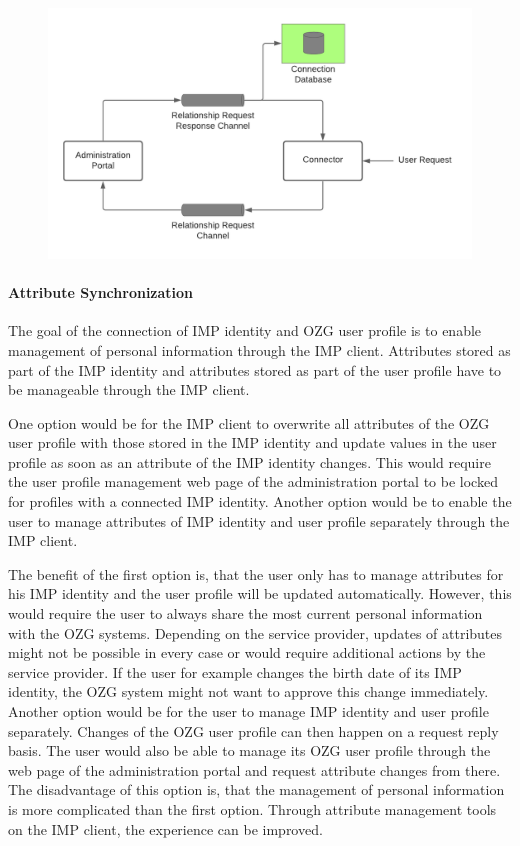 \documentclass[
     12pt,         %
     a4paper,      %
     BCOR=10mm,version=first,     %
     DIV=14,version=first,        %
     ]{scrreprt}
\begin{document}
\begin{figure}[h]
    \centering
    \includegraphics[scale=0.3]{Diagrams/Integration Architecture 1/Overview/Relationship Request.png}
\end{figure}


\paragraph{Attribute Synchronization}

The goal of the connection of IMP identity and OZG user profile is to enable management of personal information through the IMP client. Attributes stored as part of the IMP identity and attributes stored as part of the user profile have to be manageable through the IMP client.

One option would be for the IMP client to overwrite all attributes of the OZG user profile with those stored in the IMP identity and update values in the user profile as soon as an attribute of the IMP identity changes. This would require the user profile management web page of the administration portal to be locked for profiles with a connected IMP identity. Another option would be to enable the user to manage attributes of IMP identity and user profile separately through the IMP client.

The benefit of the first option is, that the user only has to manage attributes for his IMP identity and the user profile will be updated automatically. However, this would require the user to always share the most current personal information with the OZG systems. Depending on the service provider, updates of attributes might not be possible in every case or would require additional actions by the service provider. If the user for example changes the birth date of its IMP identity, the OZG system might not want to approve this change immediately. Another option would be for the user to manage IMP identity and user profile separately. Changes of the OZG user profile can then happen on a request reply basis. The user would also be able to manage its OZG user profile through the web page of the administration portal and request attribute changes from there. The disadvantage of this option is, that the management of personal information is more complicated than the first option. Through attribute management tools on the IMP client, the experience can be improved.
\end{document}
